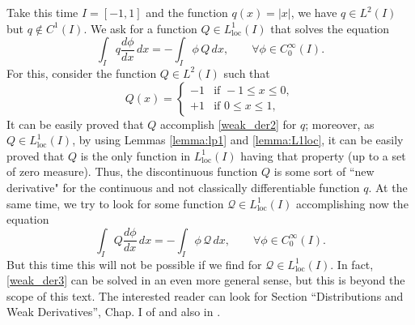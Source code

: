 Take this time $I=[-1,1]$ and the function $q(x)=|x|$, we have $q\in L^2(I)$ but $q\notin C^1(I)$. We ask for a function $Q \in L_\text{loc}^1(I)$ that solves the equation
\begin{equation}
\int_I q\frac{d\phi}{dx}\,dx=-\int_I \phi\,Q\,dx,\qquad \forall \phi \in C_0^\infty(I).\label{eq:weak_der2}
\end{equation}
For this, consider the function $Q\in L^2(I)$ such that 
$$Q(x)=\left\{\begin{array}{ll}
-1 & \text{if }-1\leq x \leq 0, \\
+1 & \text{if }0\leq x \leq 1,
\end{array}\right.$$
It can be easily proved that $Q$ accomplish \eqref{weak_der2} for $q$; moreover, as $Q\in L_\text{loc}^1(I)$, by using Lemmas \ref{lemma:lp1} and \ref{lemma:L1loc}, it can be easily proved that $Q$ is the only function in $L_\text{loc}^1(I)$ having that property (up to a set of zero measure). Thus, the discontinuous function $Q$ is some sort of ``new derivative" for the continuous and not classically differentiable function $q$. At the same time, we try to look for some function $\mathcal{Q}\in L_\text{loc}^1(I)$ accomplishing now the equation
\begin{equation}
\int_I Q\frac{d\phi}{dx}\,dx=-\int_I \phi\,\mathcal{Q}\,dx,\qquad \forall \phi \in C_0^\infty(I).\label{eq:weak_der3}
\end{equation}
But this time this will not be possible if we find for $\mathcal{Q}\in L_\text{loc}^1(I)$. In fact, \eqref{weak_der3} can be solved in an even more general sense, but this is beyond the scope of this text. The interested reader can look for Section ``Distributions and Weak Derivatives'', Chap. I of \cite{adams1975} and also in \cite{cordaro2002}.

